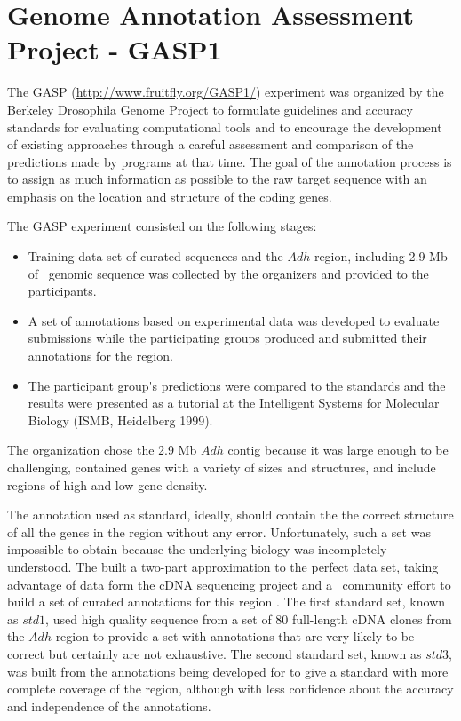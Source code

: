 \section{Genome Annotation Assessment Project - GASP1} 

The GASP (\url{http://www.fruitfly.org/GASP1/}) experiment was
organized by the Berkeley Drosophila Genome Project to formulate
guidelines and accuracy standards for evaluating computational tools
and to encourage the development of existing approaches through a
careful assessment and comparison of the predictions made by programs
at that time. The goal of the annotation process is to assign as much
information as possible to the raw target sequence with an emphasis on
the location and structure of the coding genes.

The GASP experiment consisted on the following stages:
\begin{itemize}
\item Training data set of curated sequences and the $Adh$ region,
including 2.9 Mb of \DmL\ genomic sequence was collected by the
organizers and provided to the participants.
\item A set of annotations based on experimental data was developed to
evaluate submissions while the participating groups produced and
submitted their annotations for the region.
\item The participant group\'{ }s predictions were compared to the
standards and the results were presented as a tutorial at the
Intelligent Systems for Molecular Biology (ISMB, Heidelberg 1999).
\end{itemize}

The organization chose the 2.9 Mb $Adh$ contig because it was large
enough to be challenging, contained genes with a variety of sizes and
structures, and include regions of high and low gene density.

The annotation used as standard, ideally, should contain the the
correct structure of all the genes in the region without any
error. Unfortunately, such a set was impossible to obtain because the
underlying biology was incompletely understood. The built a two-part
approximation to the perfect data set, taking advantage of data form
the cDNA sequencing project and a \Droso\ community effort to build a
set of curated annotations for this region \citep{Ashburner:1999a}.
The first standard set, known as $std1$, used high quality sequence
from a set of 80 full-length cDNA clones from the $Adh$ region to
provide a set with annotations that are very likely to be correct but
certainly are not exhaustive. The second standard set, known as
$std3$, was built from the annotations being developed for
\cite{Ashburner:1999a} to give a standard with more complete coverage
of the region, although with less confidence about the accuracy and
independence of the annotations.

